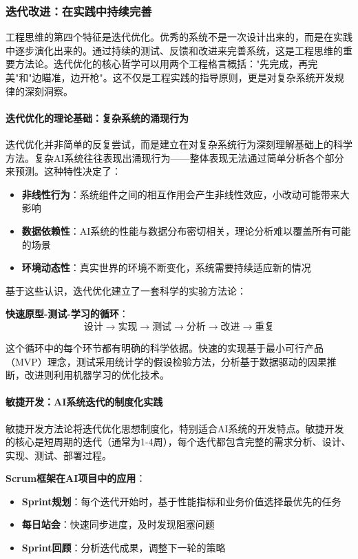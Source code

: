 \subsubsection{迭代改进：在实践中持续完善}

工程思维的第四个特征是迭代优化。优秀的系统不是一次设计出来的，而是在实践中逐步演化出来的。通过持续的测试、反馈和改进来完善系统，这是工程思维的重要方法论。迭代优化的核心哲学可以用两个工程格言概括："先完成，再完美"和"边瞄准，边开枪"。这不仅是工程实践的指导原则，更是对复杂系统开发规律的深刻洞察。

\paragraph{迭代优化的理论基础：复杂系统的涌现行为}
迭代优化并非简单的反复尝试，而是建立在对复杂系统行为深刻理解基础上的科学方法。复杂AI系统往往表现出涌现行为——整体表现无法通过简单分析各个部分来预测。这种特性决定了：

\begin{itemize}
\item \textbf{非线性行为}：系统组件之间的相互作用会产生非线性效应，小改动可能带来大影响
\item \textbf{数据依赖性}：AI系统的性能与数据分布密切相关，理论分析难以覆盖所有可能的场景
\item \textbf{环境动态性}：真实世界的环境不断变化，系统需要持续适应新的情况
\end{itemize}

基于这些认识，迭代优化建立了一套科学的实验方法论：

\textbf{快速原型-测试-学习的循环}：
$$\text{设计} \rightarrow \text{实现} \rightarrow \text{测试} \rightarrow \text{分析} \rightarrow \text{改进} \rightarrow \text{重复}$$

这个循环中的每个环节都有明确的科学依据。快速的实现基于最小可行产品（MVP）理念，测试采用统计学的假设检验方法，分析基于数据驱动的因果推断，改进则利用机器学习的优化技术。

\paragraph{敏捷开发：AI系统迭代的制度化实践}
敏捷开发方法论将迭代优化思想制度化，特别适合AI系统的开发特点。敏捷开发的核心是短周期的迭代（通常为1-4周），每个迭代都包含完整的需求分析、设计、实现、测试、部署过程。

\textbf{Scrum框架在AI项目中的应用}：
\begin{itemize}
\item \textbf{Sprint规划}：每个迭代开始时，基于性能指标和业务价值选择最优先的任务
\item \textbf{每日站会}：快速同步进度，及时发现阻塞问题
\item \textbf{Sprint回顾}：分析迭代成果，调整下一轮的策略
\end{itemize}

